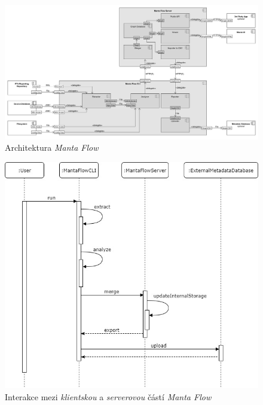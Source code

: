 \begin{figure}
\begin{center}
\includegraphics[width=14cm]{figures/flow_comp}
\caption{Architektura \textit{Manta Flow}}
\label{fig:ana-flow-comp}
\end{center}
\end{figure}

\begin{figure}
\begin{center}
\includegraphics[width=14cm]{figures/flow_seq}
\caption{Interakce mezi \textit{klientskou} a \textit{serverovou} částí \textit{Manta Flow}}
\label{fig:ana-flow-seq}
\end{center}
\end{figure}



